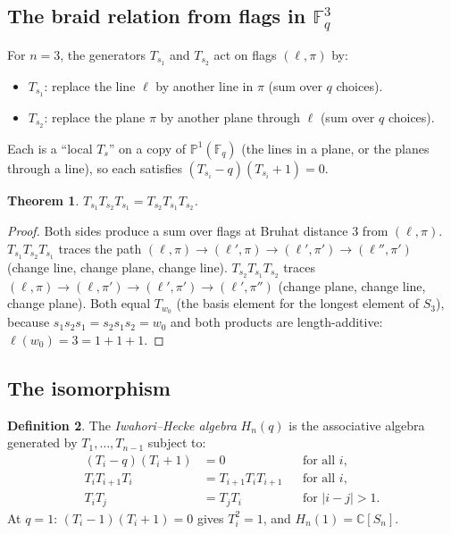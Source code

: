 \documentclass[12pt,a4paper]{article}
\newtheorem{theorem}{Theorem}[section]
\theoremstyle{definition}
\newtheorem{definition}[theorem]{Definition}
\theoremstyle{remark}
\newcommand{\C}{\mathbb{C}}
\newcommand{\F}{\mathbb{F}}
\begin{document}
\subsection{The braid relation from flags in $\F_q^3$}

For $n = 3$, the generators $T_{s_1}$ and $T_{s_2}$ act on
flags $(\ell, \pi)$ by:
\begin{itemize}
\item $T_{s_1}$: replace the line $\ell$ by another line in $\pi$
  (sum over $q$ choices).
\item $T_{s_2}$: replace the plane $\pi$ by another plane through
  $\ell$ (sum over $q$ choices).
\end{itemize}
Each is a ``local $T_s$'' on a copy of $\mathbb{P}^1(\F_q)$
(the lines in a plane, or the planes through a line), so each
satisfies $(T_{s_i} - q)(T_{s_i} + 1) = 0$.

\begin{theorem}\label{thm:braid}
$T_{s_1} T_{s_2} T_{s_1} = T_{s_2} T_{s_1} T_{s_2}$.
\end{theorem}

\begin{proof}
Both sides produce a sum over flags at Bruhat distance $3$ from
$(\ell, \pi)$.
$T_{s_1}T_{s_2}T_{s_1}$ traces the path
$(\ell, \pi) \to (\ell', \pi) \to (\ell', \pi') \to (\ell'', \pi')$
(change line, change plane, change line).
$T_{s_2}T_{s_1}T_{s_2}$ traces
$(\ell, \pi) \to (\ell, \pi') \to (\ell', \pi') \to (\ell', \pi'')$
(change plane, change line, change plane).
Both equal $T_{w_0}$ (the basis element for the longest element of
$S_3$), because $s_1 s_2 s_1 = s_2 s_1 s_2 = w_0$ and both products
are length-additive: $\ell(w_0) = 3 = 1 + 1 + 1$.
\end{proof}

\subsection{The isomorphism}

\begin{definition}
The \emph{Iwahori--Hecke algebra} $H_n(q)$ is the associative algebra
generated by $T_1, \ldots, T_{n-1}$ subject to:
\begin{align}
  (T_i - q)(T_i + 1) &= 0
  && \text{for all } i, \label{eq:IH-quad} \\
  T_i T_{i+1} T_i &= T_{i+1} T_i T_{i+1}
  && \text{for all } i, \label{eq:IH-braid} \\
  T_i T_j &= T_j T_i
  && \text{for } |i - j| > 1. \label{eq:IH-comm}
\end{align}
At $q = 1$: $(T_i - 1)(T_i + 1) = 0$ gives $T_i^2 = 1$, and
$H_n(1) = \C[S_n]$.
\end{definition}
\end{document}
